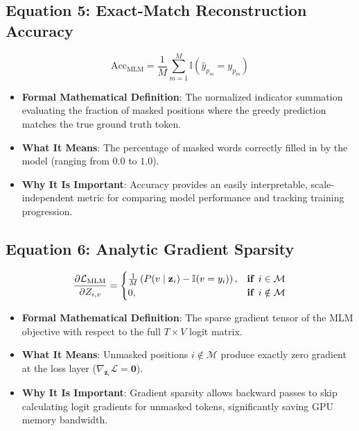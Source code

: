 \documentclass[11pt,a4paper]{article}
\theoremstyle{definition}
\begin{document}
\subsection{\textbf{Equation 5: Exact-Match Reconstruction Accuracy}}
{\boldmath
\begin{equation}
\text{Acc}_{\text{MLM}} = \frac{1}{M} \sum_{m=1}^M \mathbb{I}(\hat{y}_{p_m} = y_{p_m})
\end{equation}
}
\begin{itemize}
    \item \textbf{Formal Mathematical Definition}:
    The normalized indicator summation evaluating the fraction of masked positions where the greedy prediction matches the true ground truth token.
    \item \textbf{What It Means}:
    The percentage of masked words correctly filled in by the model (ranging from $0.0$ to $1.0$).
    \item \textbf{Why It Is Important}:
    Accuracy provides an easily interpretable, scale-independent metric for comparing model performance and tracking training progression.
\end{itemize}

\subsection{\textbf{Equation 6: Analytic Gradient Sparsity}}
{\boldmath
\begin{equation}
\frac{\partial \mathcal{L}_{\text{MLM}}}{\partial Z_{i, v}} = \begin{cases} \frac{1}{M}\left( P(v \mid \mathbf{z}_i) - \mathbb{I}(v = y_i) \right), & \text{\textbf{if }} i \in \mathcal{M} \\ 0, & \text{\textbf{if }} i \notin \mathcal{M} \end{cases}
\end{equation}
}
\begin{itemize}
    \item \textbf{Formal Mathematical Definition}:
    The sparse gradient tensor of the MLM objective with respect to the full $T \times V$ logit matrix.
    \item \textbf{What It Means}:
    Unmasked positions $i \notin \mathcal{M}$ produce exactly zero gradient at the loss layer ($\nabla_{\mathbf{z}_i} \mathcal{L} = \mathbf{0}$).
    \item \textbf{Why It Is Important}:
    Gradient sparsity allows backward passes to skip calculating logit gradients for unmasked tokens, significantly saving GPU memory bandwidth.
\end{itemize}
\end{document}
